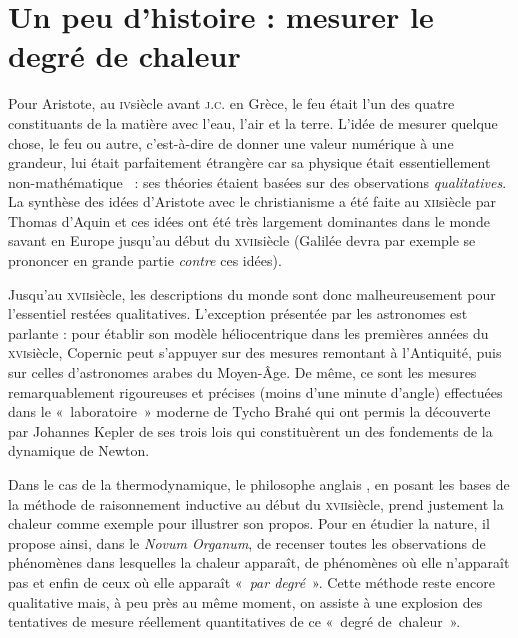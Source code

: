 \atstartofhistorysection
\section[Un peu d’histoire : mesurer le degré de chaleur]{Un peu d’histoire :\onlyamphibook{\\} mesurer le degré de chaleur}
\label{ch_histoire_degre_chaleur_depondt}


	Pour Aristote, au \textsc{iv}\ieme siècle avant \textsc{j.c.} en Grèce, le feu était l'un des quatre constituants de la matière avec l'eau, l'air et la terre. L'idée de mesurer quelque chose, le feu ou autre, c'est-à-dire de donner une valeur numérique à une grandeur, lui était parfaitement étrangère car sa physique était essentiellement non-mathématique~\cite{koyre1966} : ses théories étaient basées sur des observations \emph{qualitatives}. La synthèse des idées d'Aristote avec le christianisme a été faite au \textsc{xii}\ieme siècle par Thomas d'Aquin et ces idées ont été très largement dominantes dans le monde savant en Europe jusqu'au début du \textsc{xvii}\ieme siècle (Galilée devra par exemple se prononcer en grande partie \emph{contre} ces idées).
	
	Jusqu’au \textsc{xvii}\ieme siècle, les descriptions du monde sont donc malheureusement pour l'essentiel restées qualitatives. L’exception présentée par les astronomes est parlante : pour établir son modèle héliocentrique dans les premières années du \textsc{xvi}\ieme siècle, Copernic peut s'appuyer sur des mesures remontant à l'Antiquité, puis sur celles d’astronomes arabes du Moyen-Âge. De même, ce sont les mesures remarquablement rigoureuses et précises (moins d'une minute d'angle) effectuées dans le «~laboratoire~» moderne de Tycho Brahé qui ont permis la découverte par Johannes Kepler de ses trois lois qui constituèrent un des fondements de la dynamique de Newton.

	Dans le cas de la thermodynamique, le philosophe anglais , en posant les bases de la méthode de raisonnement inductive au début du \textsc{xvii}\ieme siècle, prend justement la chaleur comme exemple pour illustrer son propos. Pour en étudier la nature, il propose ainsi, dans le \textit{Novum Organum}, de recenser toutes les observations de phénomènes dans lesquelles la chaleur apparaît, de phénomènes où elle n'apparaît pas et enfin de ceux où elle apparaît «~\emph{par degré}~». Cette méthode reste encore qualitative mais, à peu près au même moment, on assiste à une explosion des tentatives de mesure réellement quantitatives de ce «~degré de~chaleur~».

